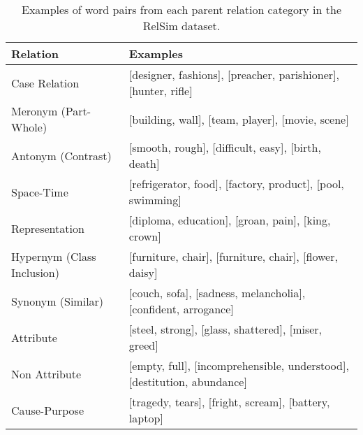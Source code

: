 \documentclass[3p]{elsarticle}
\begin{document}
{\begin{table}[t]
\centering
\begin{tabular}{ll}
\toprule
Relation        &   Examples \\
\midrule
Case Relation   &  [designer, fashions], [preacher, parishioner], [hunter, rifle] \\
Meronym (Part-Whole)      &  [building, wall], [team, player], [movie, scene] \\
Antonym (Contrast)        &  [smooth, rough], [difficult, easy], [birth, death] \\
Space-Time      &  [refrigerator, food], [factory, product], [pool, swimming] \\
Representation  &  [diploma, education], [groan, pain], [king, crown] \\
Hypernym (Class Inclusion) &  [furniture, chair], [furniture, chair], [flower, daisy] \\
Synonym (Similar)         &  [couch, sofa], [sadness, melancholia], [confident, arrogance] \\
Attribute       &  [steel, strong], [glass, shattered], [miser, greed] \\
Non Attribute   &  [empty, full], [incomprehensible, understood], [destitution, abundance] \\
Cause-Purpose   &  [tragedy, tears], [fright, scream], [battery, laptop] \\
\bottomrule
\end{tabular}
\caption{Examples of word pairs from each parent relation category in the RelSim dataset.}
\label{tab:rel-sim-examples}
\end{table}


}
\end{document}
